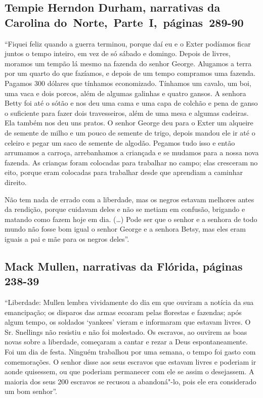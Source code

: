 \subsection{Tempie Herndon Durham, narrativas da Carolina do~Norte,~Parte~I,~páginas~289-90}
\label{ref77}

``Fiquei feliz quando a guerra terminou, porque daí eu e o Exter
podíamos ficar juntos o tempo inteiro, em vez de só sábado e domingo.
Depois de livres, moramos um tempão lá mesmo na fazenda do senhor
George. Alugamos a terra por um quarto do que fazíamos, e depois de um
tempo compramos uma fazenda. Pagamos 300 dólares que tínhamos
economizado. Tínhamos um cavalo, um boi, uma vaca e dois porcos, além de
algumas galinhas e quatro gansos. A senhora Betty foi até o sótão e nos
deu uma cama e uma capa de colchão e pena de ganso o suficiente para
fazer dois travesseiros, além de uma mesa e algumas cadeiras. Ela também
nos deu uns pratos. O senhor George deu para o Exter um alqueire de
semente de milho e um pouco de semente de trigo, depois mandou ele ir
até o celeiro e pegar um saco de semente de algodão. Pegamos tudo isso e
então arrumamos a carroça, arrebanhamos a criançada e se mudamos para a
nossa nova fazenda. As crianças foram colocadas para trabalhar no campo;
elas cresceram no eito, porque eram colocadas para trabalhar desde que
aprendiam a caminhar direito.

Não tem nada de errado com a liberdade, mas os negros estavam melhores
antes da rendição, porque cuidavam deles e não se metiam em confusão,
brigando e matando como fazem hoje em dia. (\ldots{}) Pode ser que o
senhor e a senhora de todo mundo não fosse bom igual o senhor George e a
senhora Betsy, mas eles eram iguais a pai e mãe para os negros deles''.

\subsection{Mack Mullen, narrativas da Flórida, páginas 238-39}
\label{ref204}

``Liberdade: Mullen lembra vividamente do dia em que ouviram a notícia
da sua emancipação; os disparos das armas ecoaram pelas florestas e
fazendas; após algum tempo, os soldados `yankees' vieram e informaram
que estavam livres. O Sr. Snellings não resistiu e não foi molestado. Os
escravos, ao ouvirem as boas novas sobre a liberdade, começaram a cantar
e rezar a Deus espontaneamente. Foi um dia de festa. Ninguém trabalhou
por uma semana, o tempo foi gasto com comemorações. O senhor disse aos
seus escravos que estavam livres e poderiam ir aonde quisessem, ou que
poderiam permanecer com ele se assim o desejassem. A maioria dos seus
200 escravos se recusou a abandoná"-lo, pois ele era considerado um bom
senhor''.

